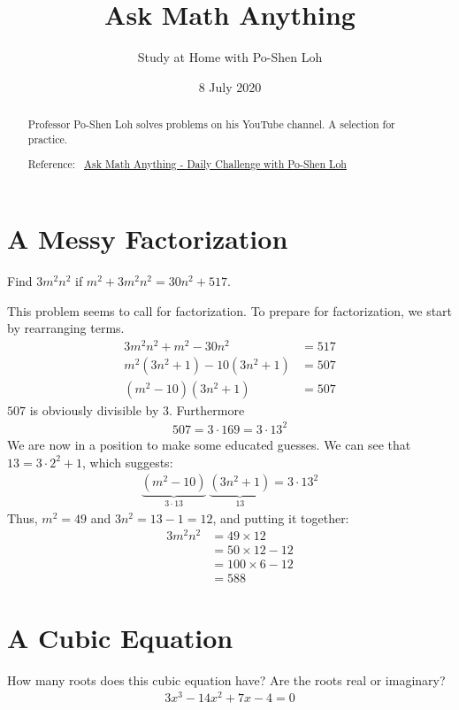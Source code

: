 \documentclass[12pt]{article}
\title{Ask Math Anything}
\author{Study at Home with Po-Shen Loh}
\date{8 July 2020}
\begin{document}
\begin{minipage}{\textwidth}
\maketitle
\begin{abstract}
Professor Po-Shen Loh solves problems on his YouTube channel. A selection for practice. 

Reference:~ 
\href{https://www.youtube.com/channel/UCf78EJOm4wQ4xXwSS15PuxQ}{Ask Math Anything - Daily Challenge with Po-Shen Loh}
\end{abstract}
\end{minipage}


\section*{A Messy Factorization}
Find $3m^{2}n^{2}$ if $m^{2}+3m^{2}n^{2}=30n^{2}+517$.

\begin{answer}
This problem seems to call for factorization. To prepare for factorization, we start by rearranging terms.
\begin{align*}
3m^{2}n^{2} + m^{2} - 30n^{2}
  & = 517 \\
m^{2}(3n^{2}+1) -10(3n^{2}+1) 
  & = 507 \\
(m^{2}-10)(3n^{2}+1) 
  & = 507
\end{align*}
$507$ is obviously divisible by $3$. Furthermore
\begin{align*}
507 = 3 \cdot 169 = 3 \cdot 13^{2}
\end{align*}
We are now in a position to make some educated guesses. We can see that $13=3 \cdot 2^{2}+1$, which suggests:
\begin{align*}
\underbrace{(m^{2}-10)}_{3\cdot 13}~\underbrace{(3n^{2}+1)}_{13} = 3 \cdot 13^{2}
\end{align*}
Thus, $m^{2}=49$ and $3n^{2}=13-1=12$, and putting it together:
\begin{align*}
3m^{2}n^{2} & = 49 \times 12 \\
  & = 50 \times 12 - 12 \\
  & = 100 \times 6 -12 \\
  & = 588
\end{align*}

\end{answer}


\section*{A Cubic Equation}
How many roots does this cubic equation have? Are the roots real or imaginary?
\begin{align*}
3 x^{3} - 14 x^2 + 7x - 4 = 0
\end{align*}
\end{document}
